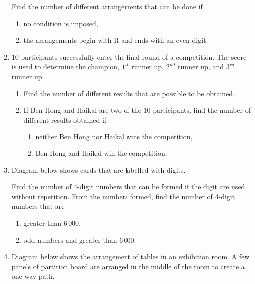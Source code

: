 \documentclass{report}
\begin{document}
\begin{multicols*}{2}
\begin{enumerate}
                  Find the number of different arrangements that can be done if
                  \begin{enumerate}
                        \item no condition is imposed,
                        \item the arrangements begin with R and ends with an even digit.
                  \end{enumerate}

            \item 10 participants successfully enter the final round of a competition. The score is used to determine the champion, $1^{st}$ runner up, $2^{nd}$ runner up, and $3^{rd}$ runner up.
                  \begin{enumerate}
                        \item Find the number of different results that are possible to be obtained.
                        \item If Ben Hong and Haikal are two of the 10 participants, find the number of
                              different results obtained if
                              \begin{enumerate}
                                    \item neither Ben Hong nor Haikal wins the competition,
                                    \item Ben Hong and Haikal win the competition.
                              \end{enumerate}
                  \end{enumerate}

            \item Diagram below shows cards that are labelled with digits.

                  Find the number of 4-digit numbers that can be formed if the digit are used
                  without repetition. From the numbers formed, find the number of 4-digit numbers
                  that are
                  \begin{enumerate}
                        \item greater than $6\,000$,
                        \item odd numbers and greater than $6\,000$.
                  \end{enumerate}

            \item Diagram below shows the arrangement of tables in an exhibition room. A few
                  panels of partition board are arranged in the middle of the room to create a
                  one-way path.


\end{enumerate}
\end{multicols*}
\end{document}
